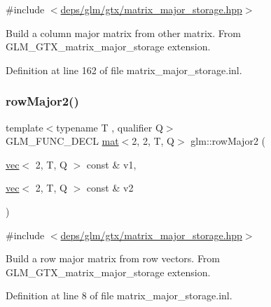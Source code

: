 {\ttfamily \#include $<$\hyperlink{matrix__major__storage_8hpp}{deps/glm/gtx/matrix\+\_\+major\+\_\+storage.\+hpp}$>$}

Build a column major matrix from other matrix. From G\+L\+M\+\_\+\+G\+T\+X\+\_\+matrix\+\_\+major\+\_\+storage extension. 

Definition at line 162 of file matrix\+\_\+major\+\_\+storage.\+inl.

\mbox{\label{group__gtx__matrix__major__storage_gaf5b1aee9e3eb1acf9d6c3c8be1e73bb8}} 
\subsubsection{\texorpdfstring{row\+Major2()}{rowMajor2()}\hspace{0.1cm}{\footnotesize\ttfamily [1/2]}}
{\footnotesize\ttfamily template$<$typename T , qualifier Q$>$ \\
G\+L\+M\+\_\+\+F\+U\+N\+C\+\_\+\+D\+E\+CL \hyperlink{structglm_1_1mat}{mat}$<$2, 2, T, Q$>$ glm\+::row\+Major2 (\begin{DoxyParamCaption}\item[{\hyperlink{structglm_1_1vec}{vec}$<$ 2, T, Q $>$ const \&}]{v1,  }\item[{\hyperlink{structglm_1_1vec}{vec}$<$ 2, T, Q $>$ const \&}]{v2 }\end{DoxyParamCaption})}



{\ttfamily \#include $<$\hyperlink{matrix__major__storage_8hpp}{deps/glm/gtx/matrix\+\_\+major\+\_\+storage.\+hpp}$>$}

Build a row major matrix from row vectors. From G\+L\+M\+\_\+\+G\+T\+X\+\_\+matrix\+\_\+major\+\_\+storage extension. 

Definition at line 8 of file matrix\+\_\+major\+\_\+storage.\+inl.

\mbox{\label{group__gtx__matrix__major__storage_gaf66c75ed69ca9e87462550708c2c6726}} 
